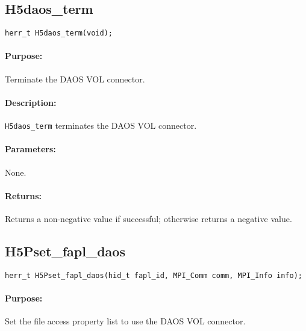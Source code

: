 \newpage
\subsection{H5daos\_term}

\begin{verbatim}
herr_t H5daos_term(void);
\end{verbatim}

\paragraph{Purpose:}
\begin{flushleft}%
Terminate the DAOS VOL connector.
\end{flushleft}%

\paragraph{Description:}
\begin{flushleft}%
\texttt{H5daos\_term} terminates the DAOS VOL connector.
\end{flushleft}%

\paragraph{Parameters:}
\begin{flushleft}%
None.
\end{flushleft}%

\paragraph{Returns:}
\begin{flushleft}%
Returns a non-negative value if successful; otherwise returns a negative value.
\end{flushleft}%

\newpage
\subsection{H5Pset\_fapl\_daos}

\begin{verbatim}
herr_t H5Pset_fapl_daos(hid_t fapl_id, MPI_Comm comm, MPI_Info info);
\end{verbatim}

\paragraph{Purpose:}
\begin{flushleft}%
Set the file access property list to use the DAOS VOL connector.
\end{flushleft}%

